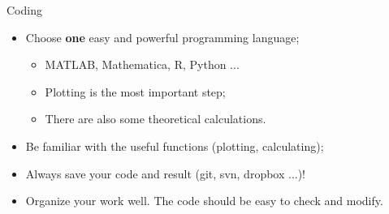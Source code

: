 \documentclass{beamer}
\begin{document}
\begin{frame}{Coding}
    \begin{itemize}
        \item Choose \textbf{one} easy and powerful programming language;
        \begin{itemize}
            \item MATLAB, Mathematica, R, Python ...
            \item Plotting is the most important step;
            \item There are also some theoretical calculations.
        \end{itemize}
        \item Be familiar with the useful functions (plotting, calculating);
        \item Always save your code and result (git, svn, dropbox ...)!
        \item Organize your work well. The code should be easy to check and modify.
    \end{itemize}
\end{frame}
\end{document}
